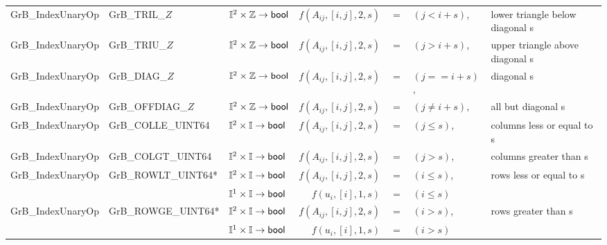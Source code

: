 \begin{landscape}
\begin{table*}
\begin{threeparttable}
\begin{tabular}{l|l|l|rcll}
{\sf GrB\_IndexUnaryOp}   & {\sf GrB\_TRIL\_$Z$}       & $\mathbb{I}^2 \times \mathbb{Z} \rightarrow {\sf bool}$ & $f(A_{ij},[i,j],2,s)$ & $=$ & $(j < i + s)$, & lower triangle below diagonal s \\
{\sf GrB\_IndexUnaryOp}   & {\sf GrB\_TRIU\_$Z$}       & $\mathbb{I}^2 \times \mathbb{Z} \rightarrow {\sf bool}$ & $f(A_{ij},[i,j],2,s)$ & $=$ & $(j > i + s)$, & upper triangle above diagonal s \\
{\sf GrB\_IndexUnaryOp}   & {\sf GrB\_DIAG\_$Z$}       & $\mathbb{I}^2 \times \mathbb{Z} \rightarrow {\sf bool}$ & $f(A_{ij},[i,j],2,s)$ & $=$ & $(j == i + s)$, & diagonal s \\
{\sf GrB\_IndexUnaryOp}   & {\sf GrB\_OFFDIAG\_$Z$}    & $\mathbb{I}^2 \times \mathbb{Z} \rightarrow {\sf bool}$ & $f(A_{ij},[i,j],2,s)$ & $=$ & $(j \neq i + s)$, & all but diagonal s \\

{\sf GrB\_IndexUnaryOp}   & {\sf GrB\_COLLE\_UINT64}   & $\mathbb{I}^2 \times \mathbb{I} \rightarrow {\sf bool}$ & $f(A_{ij},[i,j],2,s)$ & $=$ & $(j \leq s)$, & columns less or equal to s \\
{\sf GrB\_IndexUnaryOp}   & {\sf GrB\_COLGT\_UINT64}   & $\mathbb{I}^2 \times \mathbb{I} \rightarrow {\sf bool}$ & $f(A_{ij},[i,j],2,s)$ & $=$ & $(j > s)$, & columns greater than s \\
{\sf GrB\_IndexUnaryOp}   & {\sf GrB\_ROWLT\_UINT64}*  & $\mathbb{I}^2 \times \mathbb{I} \rightarrow {\sf bool}$ & $f(A_{ij},[i,j],2,s)$ & $=$ & $(i \leq s)$, & rows less or equal to s \\
                          &                            & $\mathbb{I}^1 \times \mathbb{I} \rightarrow {\sf bool}$ & $f(u_{i},[i],1,s)$ & $=$ & $(i \leq s)$  \\
{\sf GrB\_IndexUnaryOp}   & {\sf GrB\_ROWGE\_UINT64}*  & $\mathbb{I}^2 \times \mathbb{I} \rightarrow {\sf bool}$ & $f(A_{ij},[i,j],2,s)$ & $=$ & $(i > s)$, & rows greater than s \\
                          &                            & $\mathbb{I}^1 \times \mathbb{I} \rightarrow {\sf bool}$ & $f(u_{i},[i],1,s)$ & $=$ & $(i > s)$ \\
\hline
                     

\end{tabular}
\end{threeparttable}
\end{table*}
\end{landscape}

